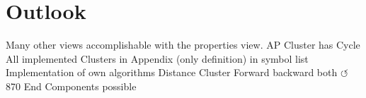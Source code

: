 \documentclass[preview]{standalone}
\begin{document}
\section{Outlook}
Many other views accomplishable with the properties view.
AP Cluster has Cycle
All implemented Clusters in Appendix (only definition)
\intmodn {} \natnums in symbol list
Implementation of own algorithms
Distance Cluster Forward backward both
$\circlearrowleft$
870 End Components possible
\end{document}
